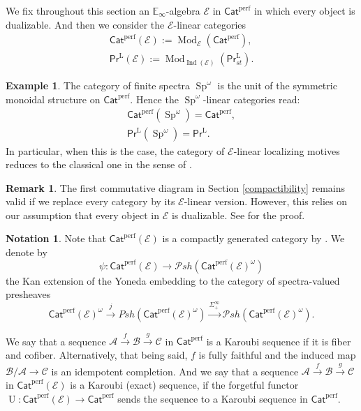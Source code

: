 \documentclass{article}
\theoremstyle{definition}
\newtheorem{nota}[thm]{Notation}
\newtheorem{ex}[thm]{Example}
\newtheorem{rmk}[thm]{Remark}
\newcommand{\on}{\operatorname}
\newcommand{\PrL}{\mathsf{Pr}^\mathrm{L} }
\begin{document}
We fix throughout this section an $\mathbb{E}_\infty$-algebra $\mathcal{E}$ in $\mathsf{Cat}^{\on{perf}}$ in which every object is dualizable. And then we consider the $\mathcal{E}$-linear categories
\[
\begin{gathered}
\mathsf{Cat}^{\on{perf}}(\mathcal{E}):=\on{Mod}_\mathcal{E}(\mathsf{Cat}^{\on{perf}}),\\
\PrL(\mathcal{E}):=\on{Mod}_{\on{Ind}(\mathcal{E})}(\PrL_{st}).
\end{gathered}\]
\begin{ex}
The category of finite spectra $\on{Sp}^\omega$ is the unit of the symmetric monoidal structure on $\mathsf{Cat}^{\on{perf}}$. Hence the $\on{Sp}^\omega$-linear categories read:
\[
\begin{gathered}
\mathsf{Cat}^{\on{perf}}(\on{Sp}^\omega)=\mathsf{Cat}^{\on{perf}},\\
\PrL(\on{Sp}^\omega)=\PrL.
\end{gathered}\]
In particular, when this is the case, the category of $\mathcal{E}$-linear localizing motives reduces to the classical one in the sense of \cite{BGT}.
\end{ex}
\begin{rmk}
The first commutative diagram in Section \ref{compactibility} remains valid if we replace every category by its $\mathcal{E}$-linear version. However, this relies on our assumption that every object in $\mathcal{E}$ is dualizable. See \cite[Proposition 4.9, Proposition 4.10]{HSS} for the proof.
\end{rmk}
\begin{nota}
Note that $\mathsf{Cat}^{\on{perf}}(\mathcal{E})$ is a compactly generated category by \cite[Corollary 4.25]{BGT}. We denote by
\[
\psi: \mathsf{Cat}^{\on{perf}}(\mathcal{E}) \rightarrow \mathcal{P}sh(\mathsf{Cat}^{\on{perf}}(\mathcal{E})^\omega)
\]the Kan extension of the Yoneda embedding to the category of spectra-valued presheaves\[
\mathsf{Cat}^{\on{perf}}(\mathcal{E})^\omega \xrightarrow{j} Psh(\mathsf{Cat}^{\on{perf}}(\mathcal{E})^\omega) \xrightarrow{\Sigma_{+}^{\infty}} \mathcal{P}sh(\mathsf{Cat}^{\on{perf}}(\mathcal{E})^\omega).\]
\end{nota}
We say that a sequence $\mathcal{A}\xrightarrow{f}\mathcal{B}\xrightarrow{g}\mathcal{C}$ in $\mathsf{Cat}^{\on{perf}}$ is a Karoubi sequence if it is fiber and cofiber. Alternatively, that being said, $f$ is fully faithful and the induced map $\mathcal{B}/\mathcal{A}\rightarrow\mathcal{C}$ is an idempotent completion. And we say that a sequence $\mathcal{A}\xrightarrow{f}\mathcal{B}\xrightarrow{g}\mathcal{C}$ in $\mathsf{Cat}^{\on{perf}}(\mathcal{E})$ is a Karoubi (exact) sequence, if the forgetful functor $\on{U}:\mathsf{Cat}^{\on{perf}}(\mathcal{E})\rightarrow \mathsf{Cat}^{\on{perf}}$ sends the sequence to a Karoubi sequence in $\mathsf{Cat}^{\on{perf}}$.
\end{document}
